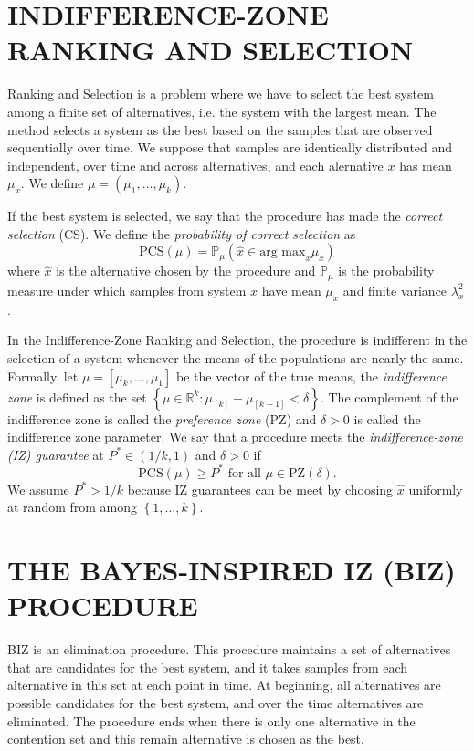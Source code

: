 \documentclass{wscpaperproc}
\theoremstyle{wsc}
\begin{document}
\section{INDIFFERENCE-ZONE RANKING AND SELECTION}

Ranking and Selection is a problem where we have to select the best system
among a finite set of alternatives, i.e. the system with the largest
mean. The method selects a system as the best based on the samples
that are observed sequentially over time. We suppose that samples
are identically distributed and independent, over time and across alternatives, and
each alernative $x$ has mean $\mu_{x}$. We define $\mu=(\mu_{1},\ldots,\mu_{k})$.

If the best system is selected, we say that the procedure has made the \emph{correct selection}
(CS). We define the \emph{probability of correct selection} as 
\[
\mbox{PCS}\left(\mu\right)=\mathbb{P}_{\mu}\left(\hat{x}\in\mbox{arg max}_{x}\mu_{x}\right)
\]
where $\hat{x}$ is the alternative chosen by the procedure and $\mathbb{P}_{\mu}$
is the probability measure under which samples from system $x$ have
mean $\mu_{x}$ and finite variance $\lambda_{x}^{2}$.

In the Indifference-Zone Ranking and Selection, the procedure is indifferent
in the selection of a system whenever the means of the populations
are nearly the same. Formally, let $\mu=\left[\mu_{k},\ldots,\mu_{1}\right]$
be the vector of the true means, the \emph{indifference zone} is defined
as the set $\left\{ \mu\in\mathbb{R}^{k}:\mu_{\left[k\right]}-\mu_{\left[k-1\right]}<\delta\right\} $.
The complement of the indifference zone is called the \emph{preference
zone} (PZ) and $\delta>0$ is called the indifference zone parameter.
We say that a procedure meets the \emph{indifference-zone (IZ) guarantee
}at $P^{*}\in\left(1/k,1\right)$ and $\delta>0$ if
\[
\mbox{PCS}\left(\mu\right)\geq P^{*}\mbox{ for all }\mu\in\mbox{PZ}\left(\delta\right).
\]
We assume $P^{*}>1/k$ because IZ guarantees can be meet by choosing
$\hat{x}$ uniformly at random from among $\left\{ 1,\ldots,k\right\} $.


\section{THE BAYES-INSPIRED IZ (BIZ) PROCEDURE}

BIZ is an elimination procedure. This procedure maintains a set of
alternatives that are candidates for the best system, and it takes samples from each
alternative in this set at each point in time. At beginning, all alternatives
are possible candidates for the best system, and over the time alternatives are eliminated.
The procedure ends when there is only one alternative in the contention
set and this remain alternative is chosen as the best. 
\end{document}
